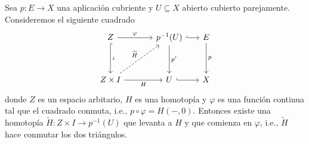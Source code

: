 \begin{lema}
    \label{lema: lema_2_aplicacion_cubriente}
    Sea $p:E\to X$ una aplicación cubriente y $U\subseteq X$ abierto cubierto parejamente. Consideremos el siguiente  cuadrado
    \begin{equation*}
        \begin{tikzcd}[column sep=1.2cm, row sep =1.2cm]
        Z\arrow["\varphi",r] \arrow["i", hook,d] & p^{-1}(U)\arrow[hook,r]\arrow[d, "p'"]& [-6.5mm] E\arrow[d, "p"]\\
        Z\times I\arrow[r, "H"']\arrow[ur, "\widetilde{H}", dashed] & U \arrow[r, hook]& X
        \end{tikzcd}
    \end{equation*}
    donde $Z$ es un espacio arbitario, $H$ es una homotopía y $\varphi$ es una función continua tal que el cuadrado conmuta, i.e., $p\circ \varphi=H(-,0)$. Entonces existe una homotopía $\widetilde{H}:Z\times I\to p^{-1}(U)$ que levanta a $H$ y que comienza en $\varphi$, i.e., $\widetilde{H}$ hace conmutar los dos triángulos.
\end{lema}

